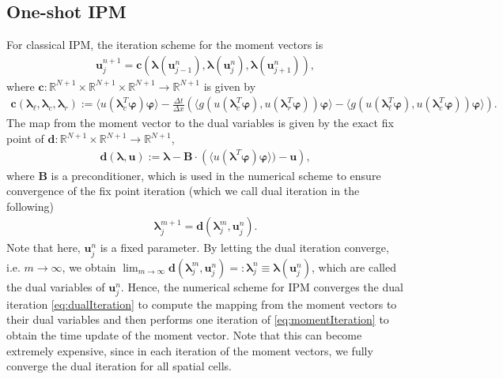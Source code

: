 \subsection{One-shot IPM}
\label{sec:OneShotIPM}
For classical IPM, the iteration scheme for the moment vectors is
\begin{align}\label{eq:momentIteration}
\bm{u}_j^{n+1} = \bm{c}\left(\bm{\lambda}(\bm{u}_{j-1}^n),\bm{\lambda}(\bm{u}_{j}^n),\bm{\lambda}(\bm{u}_{j+1}^n)\right),
\end{align}
where $\bm{c}:\mathbb{R}^{N+1}\times\mathbb{R}^{N+1}\times\mathbb{R}^{N+1}\to\mathbb{R}^{N+1}$ is given by
\begin{align*}
\bm{c}\left(\bm{\lambda}_{\ell},\bm{\lambda}_c,\bm{\lambda}_r\right):= \langle u(\bm{\lambda}_c^T\bm{\varphi})\bm{\varphi}\rangle - \frac{\Delta t}{\Delta x}\left(\langle g(u(\bm{\lambda}_c^T\bm{\varphi}),u(\bm{\lambda}_r^T\bm{\varphi}))\bm{\varphi}\rangle-\langle g(u(\bm{\lambda}_{\ell}^T\bm{\varphi}),u(\bm{\lambda}_c^T\bm{\varphi}))\bm{\varphi}\rangle\right).
\end{align*}
The map from the moment vector to the dual variables is given by the exact fix point of $\bm{d}:\mathbb{R}^{N+1}\times\mathbb{R}^{N+1}\to\mathbb{R}^{N+1}$,
\begin{align*}
\bm{d}(\bm{\lambda},\bm{u}):= \bm{\lambda}-\bm{B}\cdot \left(\langle u(\bm{\lambda}^T\bm{\varphi})\bm{\varphi}\rangle)-\bm{u}\right),
\end{align*}
where $\bm{B}$ is a preconditioner, which is used in the numerical scheme to ensure convergence of the fix point iteration (which we call dual iteration in the following)
\begin{align}\label{eq:dualIteration}
\bm{\lambda}_j^{m+1} = \bm{d}(\bm{\lambda}_j^m,\bm{u}_j^{n}).
\end{align}
Note that here, $\bm{u}_j^{n}$ is a fixed parameter. By letting the dual iteration converge, i.e. $m\rightarrow\infty$, we obtain $\lim_{m\rightarrow\infty}\bm{d}(\bm{\lambda}_j^m,\bm{u}_j^{n}) =:\bm{\lambda}_j^{n} \equiv \bm\lambda(\bm{u}_j^{n})$, which are called the dual variables of $\bm{u}_j^{n}$. Hence, the numerical scheme for IPM converges the dual iteration \eqref{eq:dualIteration} to compute the mapping from the moment vectors to their dual variables and then performs one iteration of \eqref{eq:momentIteration} to obtain the time update of the moment vector. Note that this can become extremely expensive, since in each iteration of the moment vectors, we fully converge the dual iteration for all spatial cells.

